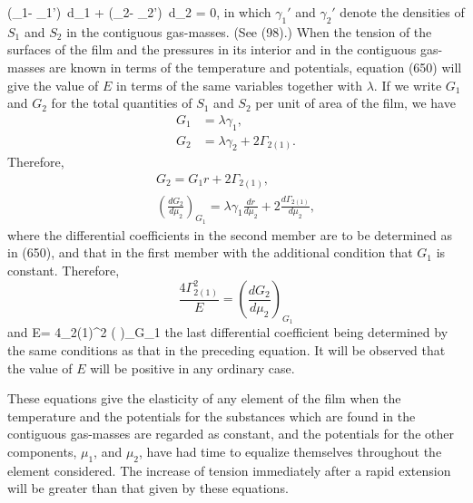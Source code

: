 \documentclass[12pt]{article}
\begin{document}
\eqs (\gamma_1- \gamma_1')\, d\mu_1 + (\gamma_2- \gamma_2')\, d\mu_2 = 0,   \label{651}\eqe
in which $\gamma_1'$ and $\gamma_2'$ denote the densities of $S_1$ and $S_2$ in the contiguous gas-masses. (See (98).) When the tension of the surfaces of the film and the pressures in its interior and in the contiguous gas-masses are known in terms of the temperature and potentials, equation (650) will give the value of $E$ in terms of the same variables together with $\lambda$.
If we write $G_1$  and $G_2$ for the total quantities of $S_1$ and $S_2$ per
unit of area of the film, we have
\begin{align}G_1&=\lambda \gamma_1,  \label{652} \\
G_2&= \lambda \gamma_2 + 2\Gamma_{2(1)}.    \label{653} \end{align}
Therefore,
\begin{gather}G_2 = G_1 r + 2\Gamma_{2(1)}, \nonumber \\
\left(\frac{dG_2}{d\mu_2} \right)_{G_1}= \lambda \gamma_1 \frac{dr}{d\mu_2} +2 \frac{d\Gamma_{2(1)}}{d\mu_2},   \label{654} \end{gather}
where the differential coefficients in the second member are to be determined as in (650), and that in the first member with the additional condition that $G_1$  is constant. Therefore,
$$\frac{4\Gamma_{2(1)}^2}{E}  = \left(\frac{dG_2}{d\mu_2} \right)_{G_1}$$
and
\eqs   E= 4\Gamma_{2(1)}^2  \left( \right)_{G_1}    \label{655} \eqe 
the last differential coefficient being determined by the same conditions as that in the preceding equation. It will be observed that the value of $E$ will be positive in any ordinary case.

These equations give the elasticity of any element of the film when the temperature and the potentials for the substances which are found in the contiguous gas-masses are regarded as constant, and the potentials for the other components, $\mu_1$, and $\mu_2$, have had time to equalize themselves throughout the element considered. The increase of tension immediately after a rapid extension will be greater than that given by these equations.
\end{document}

